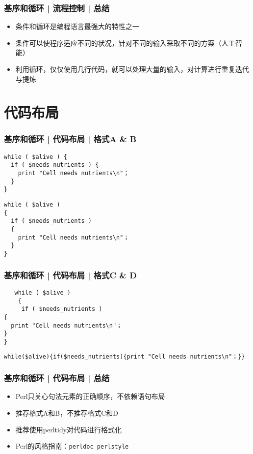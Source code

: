 \begin{frame}
  \frametitle{基序和循环 | 流程控制 | 总结}
  \begin{itemize}
    \item 条件和循环是编程语言最强大的特性之一
    \item 条件可以使程序适应不同的状况，针对不同的输入采取不同的方案（人工智能）
    \item 利用循环，仅仅使用几行代码，就可以处理大量的输入，对计算进行重复迭代与提炼
  \end{itemize}
\end{frame}

\section{代码布局}
\begin{frame}[fragile]
  \frametitle{基序和循环 | 代码布局 | 格式A \& B}
\begin{lstlisting}
while ( $alive ) {
  if ( $needs_nutrients ) {
    print "Cell needs nutrients\n"；
  }
}
\end{lstlisting}
\pause
\begin{lstlisting}
while ( $alive )
{
  if ( $needs_nutrients )
  {
    print "Cell needs nutrients\n"；
  }
}
\end{lstlisting}
\end{frame}

\begin{frame}[fragile]
  \frametitle{基序和循环 | 代码布局 | 格式C \& D}
\begin{lstlisting}
   while ( $alive )
    {
     if ( $needs_nutrients )
{
  print "Cell needs nutrients\n"；
}
}
\end{lstlisting}
\pause
\begin{lstlisting}
while($alive){if($needs_nutrients){print "Cell needs nutrients\n"；}}
\end{lstlisting}
\end{frame}

\begin{frame}[fragile]
  \frametitle{基序和循环 | 代码布局 | 总结}
  \begin{itemize}
    \item Perl只关心句法元素的正确顺序，不依赖语句布局
    \item 推荐格式A和B，不推荐格式C和D
    \item 推荐使用perltidy对代码进行格式化
    \item Perl的风格指南：\verb|perldoc perlstyle|
  \end{itemize}
\end{frame}

